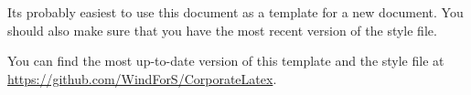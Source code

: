 Its probably easiest to use this document as a template for a new document. You should also make sure that you have the most recent version of the style file.

You can find the most up-to-date version of this template and the style file at \href{https://github.com/WindForS/CorporateLatex}{https://github.com/WindForS/CorporateLatex}.

